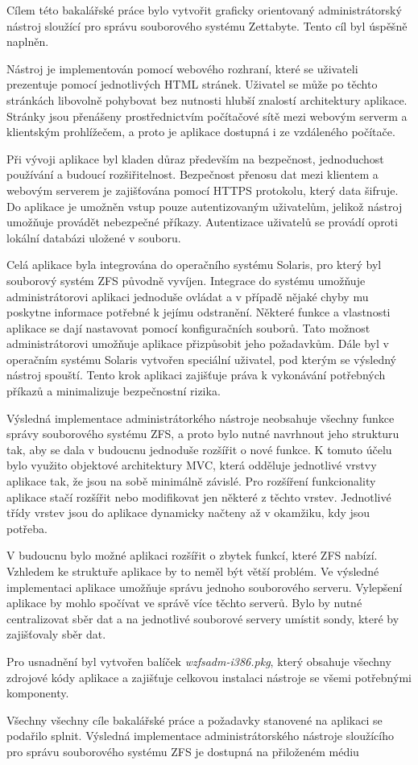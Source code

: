 Cílem této bakalářské práce bylo vytvořit graficky orientovaný administrátorský nástroj sloužící pro správu souborového systému Zettabyte. Tento cíl byl úspěšně naplněn.

Nástroj je implementován pomocí webového rozhraní, které se uživateli prezentuje pomocí jednotlivých HTML stránek. Uživatel se může po těchto stránkách libovolně pohybovat bez nutnosti hlubší znalostí architektury aplikace. Stránky jsou přenášeny prostřednictvím počítačové sítě mezi webovým serverm a klientským prohlížečem, a proto je aplikace dostupná i ze vzdáleného počítače.

Při vývoji aplikace byl kladen důraz především na bezpečnost, jednoduchost používání a budoucí rozšiřitelnost. Bezpečnost přenosu dat mezi klientem a webovým serverem je zajišťována pomocí HTTPS protokolu, který data šifruje. Do aplikace je umožněn vstup pouze autentizovaným uživatelům, jelikož nástroj umožňuje provádět nebezpečné příkazy. Autentizace uživatelů se provádí oproti lokální databázi uložené v souboru.

Celá aplikace byla integrována do operačního systému Solaris, pro který byl souborový systém ZFS původně vyvíjen. Integrace do systému umožňuje administrátorovi aplikaci jednoduše ovládat a v případě nějaké chyby mu poskytne informace potřebné k jejímu odstranění. Některé funkce a vlastnosti aplikace se dají nastavovat pomocí konfiguračních souborů. Tato možnost administrátorovi umožňuje aplikace přizpůsobit jeho požadavkům. Dále byl v operačním systému Solaris vytvořen speciální uživatel, pod kterým se výsledný nástroj spouští. Tento krok aplikaci zajišťuje práva k vykonávání potřebných příkazů a minimalizuje bezpečnostní rizika.

Výsledná implementace administrátorkého nástroje neobsahuje všechny funkce správy souborového systému ZFS, a proto bylo nutné navrhnout jeho strukturu tak, aby se dala v budoucnu jednoduše rozšířit o nové funkce. K tomuto účelu bylo využito objektové architektury MVC, která odděluje jednotlivé vrstvy aplikace tak, že jsou na sobě minimálně závislé. Pro rozšíření funkcionality aplikace stačí rozšířit nebo modifikovat jen některé z těchto vrstev. Jednotlivé třídy vrstev jsou do aplikace dynamicky načteny až v okamžiku, kdy jsou potřeba.

V budoucnu bylo možné aplikaci rozšířit o zbytek funkcí, které ZFS nabízí. Vzhledem ke struktuře aplikace by to neměl být větší problém. Ve výsledné implementaci aplikace umožňuje správu jednoho souborového serveru. Vylepšení aplikace by mohlo spočívat ve správě více těchto serverů. Bylo by nutné centralizovat sběr dat a na jednotlivé souborové servery umístit sondy, které by zajišťovaly sběr dat. 

Pro usnadnění byl vytvořen balíček \emph{wzfsadm-i386.pkg}, který obsahuje všechny zdrojové kódy aplikace a zajišťuje celkovou instalaci nástroje se všemi potřebnými komponenty.

Všechny všechny cíle bakalářské práce a požadavky stanovené na aplikaci se podařilo splnit. Výsledná implementace administrátorského nástroje sloužícího pro správu souborového systému ZFS je dostupná na přiloženém médiu




